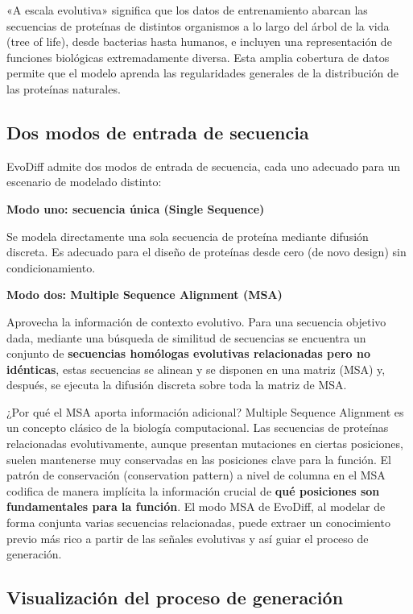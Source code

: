 \documentclass[a4paper]{article}
\begin{document}
«A escala evolutiva» significa que los datos de entrenamiento abarcan las secuencias de proteínas de distintos organismos a lo largo del árbol de la vida (tree of life), desde bacterias hasta humanos, e incluyen una representación de funciones biológicas extremadamente diversa. Esta amplia cobertura de datos permite que el modelo aprenda las regularidades generales de la distribución de las proteínas naturales.

\subsection{Dos modos de entrada de secuencia}

EvoDiff admite dos modos de entrada de secuencia, cada uno adecuado para un escenario de modelado distinto:

\textbf{Modo uno: secuencia única (Single Sequence)}

Se modela directamente una sola secuencia de proteína mediante difusión discreta. Es adecuado para el diseño de proteínas desde cero (de novo design) sin condicionamiento.

\textbf{Modo dos: Multiple Sequence Alignment (MSA)}

Aprovecha la información de contexto evolutivo. Para una secuencia objetivo dada, mediante una búsqueda de similitud de secuencias se encuentra un conjunto de \textbf{secuencias homólogas evolutivas relacionadas pero no idénticas}, estas secuencias se alinean y se disponen en una matriz (MSA) y, después, se ejecuta la difusión discreta sobre toda la matriz de MSA.

\begin{knowledgebox}{¿Por qué el MSA aporta información adicional?}
Multiple Sequence Alignment es un concepto clásico de la biología computacional. Las secuencias de proteínas relacionadas evolutivamente, aunque presentan mutaciones en ciertas posiciones, suelen mantenerse muy conservadas en las posiciones clave para la función. El patrón de conservación (conservation pattern) a nivel de columna en el MSA codifica de manera implícita la información crucial de \textbf{qué posiciones son fundamentales para la función}. El modo MSA de EvoDiff, al modelar de forma conjunta varias secuencias relacionadas, puede extraer un conocimiento previo más rico a partir de las señales evolutivas y así guiar el proceso de generación.
\end{knowledgebox}

\subsection{Visualización del proceso de generación}
\end{document}
